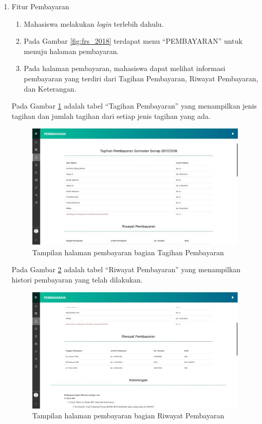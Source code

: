 \begin{enumerate}
	\item Fitur Pembayaran
	\begin{enumerate}
		\item Mahasiswa melakukan \textit{login} terlebih dahulu. 
		\item Pada Gambar \ref{fig:frs_2018} terdapat menu ``PEMBAYARAN'' untuk menuju halaman pembayaran. 
		\item Pada halaman pembayaran, mahasiswa dapat melihat informasi pembayaran yang terdiri dari Tagihan Pembayaran, Riwayat Pembayaran, dan Keterangan.
	\end{enumerate}
	Pada Gambar \ref{fig:bayar_2018} adalah tabel ``Tagihan Pembayaran'' yang menampilkan jenis tagihan dan jumlah tagihan dari setiap jenis tagihan yang ada.
	\begin{figure}[H]
		\centering
		\includegraphics[scale=0.7]{Gambar/bayar2018.jpg}
		\caption{Tampilan halaman pembayaran bagian Tagihan Pembayaran} 
		\label{fig:bayar_2018}
	\end{figure}
	
	Pada Gambar \ref{fig:riw_2018} adalah tabel ``Riwayat Pembayaran'' yang menampilkan histori pembayaran yang telah dilakukan.
	\begin{figure}[H]
		\centering
		\includegraphics[scale=0.7]{Gambar/riwayat2018.jpg}
		\caption{Tampilan halaman pembayaran bagian Riwayat Pembayaran} 
		\label{fig:riw_2018}
	\end{figure}
	

\end{enumerate}
